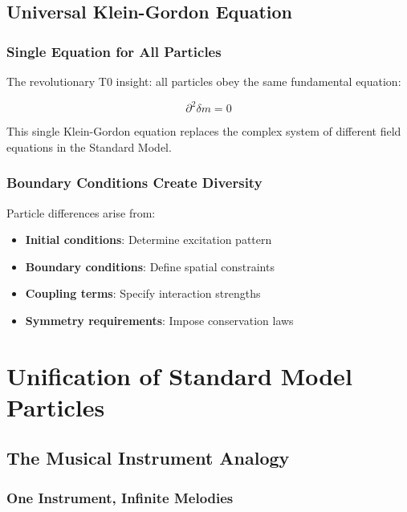 \documentclass[12pt,a4paper]{article}
\newcommand{\deltafield}{\ensuremath{\delta m}}
\begin{document}
	\subsection{Universal Klein-Gordon Equation}
	\label{subsec:universal_klein_gordon}
	
	\subsubsection{Single Equation for All Particles}
	\label{subsubsec:single_equation}
	
	The revolutionary T0 insight: all particles obey the same fundamental equation:
	
	\begin{equation}
		\boxed{\partial^2 \deltafield = 0}
		\label{eq:universal_equation}
	\end{equation}
	
	This single Klein-Gordon equation replaces the complex system of different field equations in the Standard Model.
	
	\subsubsection{Boundary Conditions Create Diversity}
	\label{subsubsec:boundary_conditions}
	
	Particle differences arise from:
	\begin{itemize}
		\item \textbf{Initial conditions}: Determine excitation pattern
		\item \textbf{Boundary conditions}: Define spatial constraints  
		\item \textbf{Coupling terms}: Specify interaction strengths
		\item \textbf{Symmetry requirements}: Impose conservation laws
	\end{itemize}
	
	\section{Unification of Standard Model Particles}
	\label{sec:sm_unification}
	
	\subsection{The Musical Instrument Analogy}
	\label{subsec:musical_analogy}
	
	\subsubsection{One Instrument, Infinite Melodies}
	\label{subsubsec:one_instrument}
	
\end{document}
